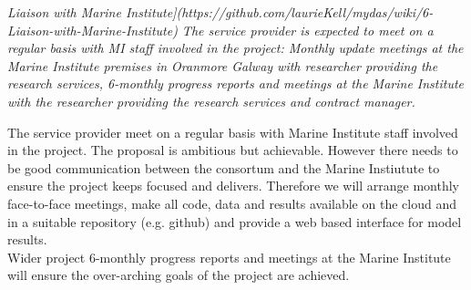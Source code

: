 
\textit{Liaison with Marine Institute](https://github.com/laurieKell/mydas/wiki/6-Liaison-with-Marine-Institute)
The service provider is expected to meet on a regular basis with MI staff involved in the project:
Monthly update meetings at the Marine Institute premises in Oranmore Galway with researcher providing the research services, 
6-monthly progress reports and meetings at the Marine Institute with the researcher providing the research services and contract manager.}

The service provider meet on a regular basis with Marine Institute staff involved in the project. 
The proposal is ambitious but achievable. However there needs to be good communication between the consortum and the Marine Instiutute to ensure the project keeps focused and delivers. Therefore we will arrange monthly face-to-face meetings, make all code, data and results available on the cloud and in a suitable repository (e.g. github) and provide a web based interface for model results.\\
Wider project 6-monthly progress reports and meetings at the Marine Institute will ensure the over-arching goals of the project are achieved.
